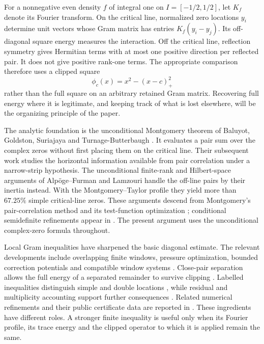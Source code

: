 \documentclass[11pt,reqno]{amsart}
\numberwithin{equation}{section}
\begin{document}
For a nonnegative even density \(f\) of integral one on
\(I=[-1/2,1/2]\), let \(K_f\) denote its Fourier transform. On the
critical line, normalized zero locations \(y_i\) determine unit vectors
whose Gram matrix has entries \(K_f(y_i-y_j)\). Its off-diagonal
square energy measures the interaction. Off the critical line,
reflection symmetry gives Hermitian terms with at most one positive
direction per reflected pair. It does not give positive rank-one
terms. The appropriate comparison therefore uses a clipped square
\[
 \phi_c(x)=x^2-(x-c)_+^2
\]
rather than the full square on an arbitrary retained Gram matrix.
Recovering full energy where it is legitimate, and keeping track of
what is lost elsewhere, will be the organizing principle of the paper.

The analytic foundation is the unconditional Montgomery theorem of
Baluyot, Goldston, Suriajaya and Turnage-Butterbaugh
\cite{BGSTB}. It evaluates a pair sum over the complex zeros without
first placing them on the critical line. Their subsequent work
\cite{BGSTBI} studies the horizontal information available from pair
correlation under a narrow-strip hypothesis. The unconditional
finite-rank and Hilbert-space arguments of Alp\"oge--Furman and
Lamzouri \cite{AF,Lamzouri} handle the off-line pairs by their inertia
instead. With the Montgomery--Taylor profile they yield more than
\(67.25\%\) simple critical-line zeros. These arguments descend from
Montgomery's pair-correlation method and its test-function
optimization \cite{Montgomery,MontgomeryTaylor}; conditional
semidefinite refinements appear in \cite{CGdL}. The present argument
uses the unconditional complex-zero formula throughout.

Local Gram inequalities have sharpened the basic diagonal estimate.
The relevant developments include overlapping finite windows,
pressure optimization, bounded correction potentials and compatible
window systems
\cite{Ainta,AMTOPA,Tawanerguo,ChandruP6,GebendorferWindows,GebendorferExpanded}.
Close-pair separation allows the full energy of a separated remainder
to survive clipping \cite{Freund,DSouza,Knausgard2026}. Labelled
inequalities distinguish simple and double locations
\cite{KnausgardDistinct,Santibanez,Knausgard2026}, while residual and
multiplicity accounting support further consequences
\cite{Lamzouri,ChandruP6,ShiTrace,Rakitin,Waddle}.
Related numerical refinements and their public certificate data are
reported in \cite{OjhaTrmdy,Schafer,Singh}.
These ingredients have different roles. A stronger finite inequality
is useful only when its Fourier profile, its trace energy and the
clipped operator to which it is applied remain the same.
\end{document}

